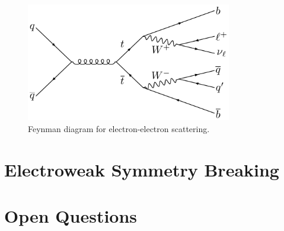 \begin{figure}[htb]
    \centering
    \includegraphics[width=0.8\textwidth]{fig/feynman/ttbar/ttbar_onelep.pdf} %
    \caption{
        Feynman diagram for electron-electron scattering. 
    }
    \label{fig:ee_scatter}
\end{figure}

\section{Electroweak Symmetry Breaking}
\section{Open Questions}
